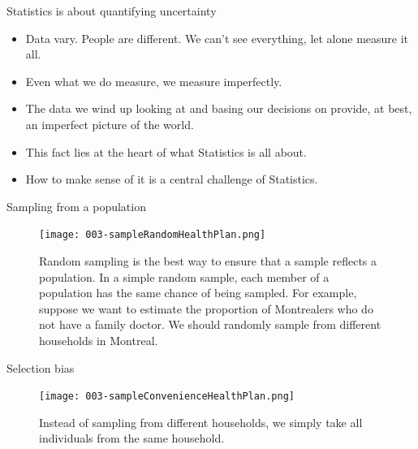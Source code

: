\documentclass[10pt,handout]{beamer}\usepackage[]{graphicx}\usepackage[]{color}
\begin{document}
\begin{frame}{Statistics is about quantifying uncertainty}


\begin{itemize}
	\item Data vary. People are different. We can't see everything, let alone measure
	it all. 
	\item Even what we do measure, we measure imperfectly. 
	\item The data we wind up looking at and basing our decisions on provide, at best, an imperfect
	picture of the world.
	 \item This fact lies at the heart of what Statistics is all about.	
	 \item How to make sense of it is a central challenge of Statistics.
\end{itemize}
	
\end{frame}




\begin{frame}{Sampling from a population}

\begin{figure}
\centering
\texttt{[image: 003-sampleRandomHealthPlan.png]}
\caption{Random sampling is the best way to ensure that a sample reflects a population. In a simple random sample, each member of a population has the same chance of being sampled. For example, suppose we want to estimate the proportion of Montrealers who do not have a family doctor. We should randomly sample from different households in Montreal.}
\end{figure}
\end{frame}




\begin{frame}{Selection bias}
	
	\begin{figure}
		\centering
		\texttt{[image: 003-sampleConvenienceHealthPlan.png]}
		\caption{Instead of sampling from different households, we simply take all individuals from the same household.}
	\end{figure}
\end{frame}
\end{document}
